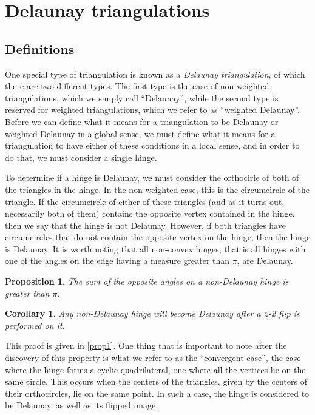 \documentclass[12pt]{article}
\newtheorem{proposition}[theorem]{Proposition}
\newtheorem{corollary}[theorem]{Corollary}
\begin{document}
\section{Delaunay triangulations}
\label{DT}

\subsection{Definitions}
\label{DTD}

\noindent One special type of triangulation is known as a \textit{Delaunay triangulation}, of which there are two different types. The first type is the case of non-weighted triangulations, which we simply call ``Delaunay'', while the second type is reserved for weighted triangulations, which we refer to as ``weighted Delaunay''. Before we can define what it means for a triangulation to be Delaunay or weighted Delaunay in a global sense, we must define what it means for a triangulation to have either of these conditions in a local sense, and in order to do that, we must consider a single hinge.\newline

\noindent To determine if a hinge is Delaunay, we must consider the orthocirle of both of the triangles in the hinge. In the non-weighted case, this is the circumcircle of the triangle. If the circumcircle of either of these triangles (and as it turns out, necessarily both of them) contains the opposite vertex contained in the hinge, then we say that the hinge is not Delaunay. However, if both triangles have circumcircles that do not contain the opposite vertex on the hinge, then the hinge is Delaunay. It is worth noting that all non-convex hinges, that is all hinges with one of the angles on the edge having a measure greater than $\pi$, are Delaunay.\newline

\begin{proposition}
\label{NonDelProp}
The sum of the opposite angles on a non-Delaunay hinge is greater than $\pi$.
\end{proposition}

\begin{corollary}
\label{FlipProp}
Any non-Delaunay hinge will become Delaunay after a 2-2 flip is performed on it.
\end{corollary}

\noindent This proof is given in \ref{prop1}. One thing that is important to note after the discovery of this property is what we refer to as the ``convergent case'', the case where the hinge forms a cyclic quadrilateral, one where all the vertices lie on the same circle. This occurs when the centers of the triangles, given by the centers of their orthocircles, lie on the same point. In such a case, the hinge is considered to be Delaunay, as well as its flipped image.\newline
\end{document}
